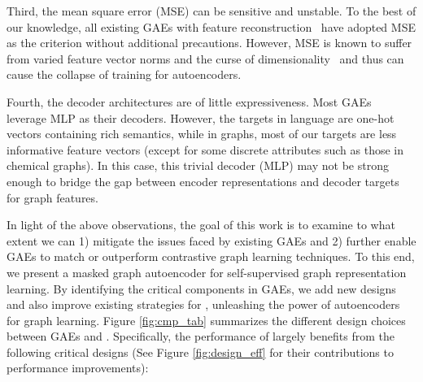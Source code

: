 Third, 
the mean square error (MSE) can be sensitive and unstable. 
To the best of our knowledge, 
all existing GAEs with feature reconstruction~\cite{wang2017mgae,park2019symmetric,amin2020gate,hu2020gpt,jin2020self} have adopted MSE as the criterion without additional precautions. 
However, MSE is known to suffer from varied feature vector norms and the curse of dimensionality~\cite{Friedman2004OnBV} 
and thus can cause the collapse of training for autoencoders. 

Fourth, 
the decoder architectures are of little expressiveness. 
Most GAEs~\cite{kipf2016variational,pan2018adversarially,wang2017mgae,hu2020strategies,hu2020gpt,cui2020adaptive,jin2020self} leverage  MLP as their decoders. %
However, the targets in language are one-hot vectors containing rich semantics, while in graphs, most of our targets are less informative feature vectors (except for some discrete attributes such as those in chemical graphs). 
In this case, this trivial decoder (MLP) may not be strong enough to bridge the gap between encoder representations and decoder targets for graph features.






In light of the above observations, the goal of this work is to examine to what extent we can 1) mitigate the issues faced by existing GAEs and 2) further enable GAEs to match or outperform contrastive graph learning techniques. 
To this end, we present a masked graph autoencoder \model for self-supervised graph representation learning. 
By identifying the critical components in GAEs, we add new designs and also improve existing strategies for \model, unleashing the power of autoencoders for graph learning. 
Figure \ref{fig:cmp_tab} summarizes the different design choices between GAEs and \model. 
Specifically, the performance of \model largely benefits from the following critical designs  (See Figure \ref{fig:design_eff} for their contributions to performance improvements):

